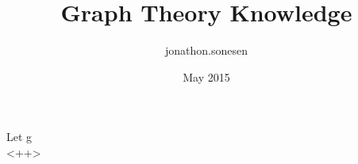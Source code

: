 \documentclass[fleqn]{article}
\title{Graph Theory Knowledge}
\author{jonathon.sonesen }
\date{May 2015}
\begin{document}
\maketitle

\section{}
Let g 
\begin{equation}
  
  \label{<++>}
\end{equation}<++>
\end{document}
